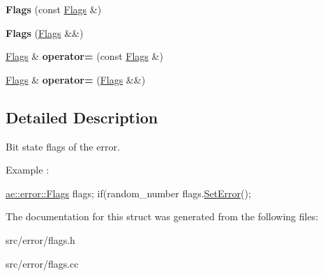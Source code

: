 \begin{DoxyCompactItemize}
\item 
\hypertarget{structae_1_1error_1_1_flags_a20c944aed64eceeec6e4eb34553f499e}{}\label{structae_1_1error_1_1_flags_a20c944aed64eceeec6e4eb34553f499e} 
{\bfseries Flags} (const \hyperlink{structae_1_1error_1_1_flags}{Flags} \&)
\item 
\hypertarget{structae_1_1error_1_1_flags_a02aa5d86c37d9f80a4de795fb81b1c19}{}\label{structae_1_1error_1_1_flags_a02aa5d86c37d9f80a4de795fb81b1c19} 
{\bfseries Flags} (\hyperlink{structae_1_1error_1_1_flags}{Flags} \&\&)
\item 
\hypertarget{structae_1_1error_1_1_flags_a0a215694736b3b865b639c5b5abd173c}{}\label{structae_1_1error_1_1_flags_a0a215694736b3b865b639c5b5abd173c} 
\hyperlink{structae_1_1error_1_1_flags}{Flags} \& {\bfseries operator=} (const \hyperlink{structae_1_1error_1_1_flags}{Flags} \&)
\item 
\hypertarget{structae_1_1error_1_1_flags_ae08dbfd93ce5d40516fc3b27fb82d196}{}\label{structae_1_1error_1_1_flags_ae08dbfd93ce5d40516fc3b27fb82d196} 
\hyperlink{structae_1_1error_1_1_flags}{Flags} \& {\bfseries operator=} (\hyperlink{structae_1_1error_1_1_flags}{Flags} \&\&)
\end{DoxyCompactItemize}



\subsection{Detailed Description}
Bit state flags of the error. 

Example \+:


\begin{DoxyCode}
\hyperlink{structae_1_1error_1_1_flags}{ae::error::Flags} flags;
\textcolor{keywordflow}{if}(random\_number %
    flags.\hyperlink{structae_1_1error_1_1_flags_a0564df5fa77cd2ef1dd7dcb0ce4105b9}{SetError}();
\end{DoxyCode}
 

The documentation for this struct was generated from the following files\+:\begin{DoxyCompactItemize}
\item 
src/error/flags.\+h\item 
src/error/flags.\+cc\end{DoxyCompactItemize}
